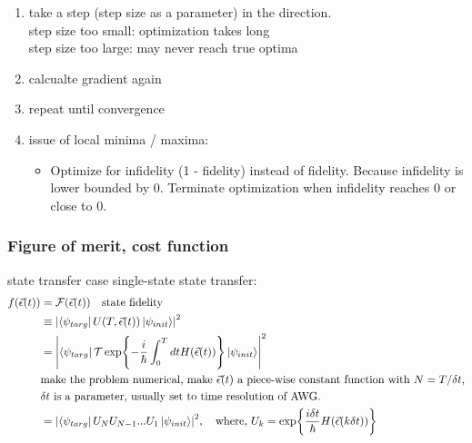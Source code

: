 \documentclass{article}
\begin{document}
\begin{enumerate}
\begin{enumerate}
        \end{enumerate}
    \item take a step (step size as a parameter) in the direction. \\
        step size too small: optimization takes long\\
        step size too large: may never reach true optima
    \item calcualte gradient again
    \item repeat until convergence
    \item issue of local minima / maxima: 
        \begin{itemize}
            \item Optimize for infidelity (1 - fidelity) instead of fidelity. 
                Because infidelity is lower bounded by 0. Terminate optimization when infidelity reaches 0 or close to 0. 
        \end{itemize}
\end{enumerate}

\subsubsection{Figure of merit, cost function}
state transfer case
single-state state transfer: 
\begin{align*}
    f(\vec{\epsilon}(t)) &= \mathcal{F}(\vec{\epsilon}(t)) \quad \text{state fidelity}\\
    &\equiv \abs{\bra{\psi_{targ}} U(T,\vec{\epsilon}(t)) \ket{\psi_{init}}}^2 \\
    &= \abs{\bra{\psi_{targ}} 
        \mathcal{T}\exp{-\frac{i}{\hbar}\int_0^T dt H(\vec{\epsilon}(t))}
        \ket{\psi_{init}}}^2 \\
    &\text{make the problem numerical, make $\vec{\epsilon}(t)$ a piece-wise constant function with $N=T/\delta t$,} \\
    &\text{$\delta t$ is a parameter, usually set to time resolution of AWG.} \\
    &= \abs{\bra{\psi_{targ}} 
        U_NU_{N-1}...U_1
        \ket{\psi_{init}}}^2, \quad \text{where, } U_k=\exp{\frac{i\delta t}{\hbar}H(\vec{\epsilon}(k\delta t))} \\
\end{align*}
\end{document}
